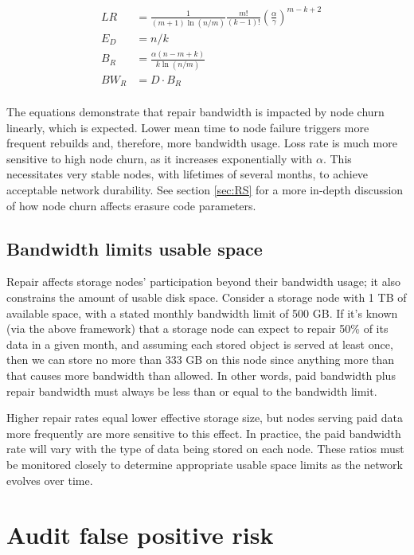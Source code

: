 \documentclass[8pt,fleqn,openany]{book}
\begin{document}
\begin{align*}
&&LR&=\frac{1}{(m+1)\ln(n/m)}\frac{m!}{(k-1)!}\left(\frac{\alpha}{\gamma}\right)^{m-k+2}&\\
&&E_D&=n/k&\\
&&B_R&=\frac{\alpha (n-m+k)}{k\ln(n/m)}&\\
&&BW_R&=D\cdot B_R&\\
\end{align*}

The equations demonstrate that repair bandwidth is impacted by node churn
linearly, which is expected.
Lower mean time to node failure triggers more frequent rebuilds and,
therefore, more bandwidth usage.
Loss rate is much more sensitive to high node churn, as it increases
exponentially with $\alpha$.
This necessitates very stable nodes, with lifetimes of several months, to
achieve acceptable network durability.
See section \ref{sec:RS} for a more in-depth discussion of how node churn
affects erasure code parameters.

\subsection{Bandwidth limits usable space}\label{sec:bandwidth-space-limits}

Repair affects storage nodes' participation beyond their bandwidth usage; it
also constrains the amount of usable disk space.
Consider a storage node with 1 TB of available space, with a stated monthly
bandwidth limit of 500 GB.
If it's known (via the above framework) that a storage node can expect to
repair 50\% of its data in a given month, and assuming each stored object
is served at least once, then we can store no more than 333 GB on this node
since anything more than that causes more bandwidth than allowed.
In other words, paid bandwidth plus repair bandwidth must always be less than
or equal to the bandwidth limit.

Higher repair rates equal lower effective storage size, but nodes serving paid
data more frequently are more sensitive to this effect.
In practice, the paid bandwidth rate will vary with the type of data being
stored on each node.
These ratios must be monitored closely to determine appropriate usable space
limits as the network evolves over time.

\pagebreak
\section{Audit false positive risk}\label{sec:audit-false-positive}
\end{document}
